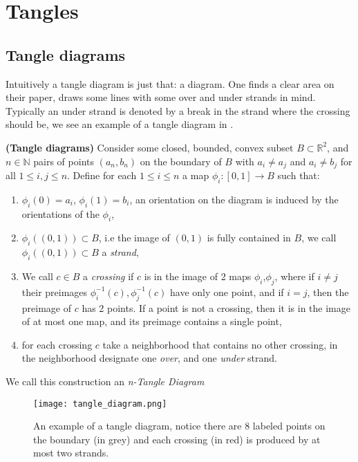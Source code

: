 \section{Tangles}

\subsection{Tangle diagrams}

Intuitively a tangle diagram is just that: a diagram. One finds a clear area on their paper, draws some lines with some over and under strands in mind. Typically an under strand is denoted by a break in the strand where the crossing should be, we see an example of a tangle diagram in .

\begin{definition}\textbf{(Tangle diagrams)}
Consider some closed, bounded, convex subset $B\subset\mathbb R^2$, and $n\in\mathbb N$ pairs of points $(a_n,b_n)$ on the boundary of $B$ with $a_i\neq a_j$ and $a_i\neq b_j$ for all $1\le i,j\le n$. Define for each $1\le i\le n$ a map $\phi_i:[0,1]\to B$ such that:
\begin{enumerate}
\item $\phi_i(0)=a_i$, $\phi_i(1)=b_i$, an orientation on the diagram is induced by the orientations of the $\phi_i$,
\item $\phi_i((0,1))\subset B$, i.e the image of $(0,1)$ is fully contained in $B$, we call $\phi_i((0,1))\subset B$ a \textit{strand},
\item We call $c\in B$ a \textit{crossing} if $c$ is in the image of 2 maps $\phi_i$,$\phi_j$, where if $i\neq j$ their preimages $\phi_i^{-1}(c),\phi_j^{-1}(c)$ have only one point, and if $i=j$, then the preimage of $c$ has 2 points. If a point is not a crossing, then it is in the image of at most one map, and its preimage contains a single point,
\item for each crossing $c$ take a neighborhood that contains no other crossing, in the neighborhood designate one \textit{over}, and one \textit{under} strand.
\end{enumerate}
We call this construction an \textit{n-Tangle Diagram}
\end{definition}

\begin{figure}[h!]
\centering
\texttt{[image: tangle\_diagram.png]}
\caption{An example of a tangle diagram, notice there are 8 labeled points on the boundary (in grey) and each crossing (in red) is produced by at most two strands.}
\label{fig:tangle_diagram}
\end{figure}

